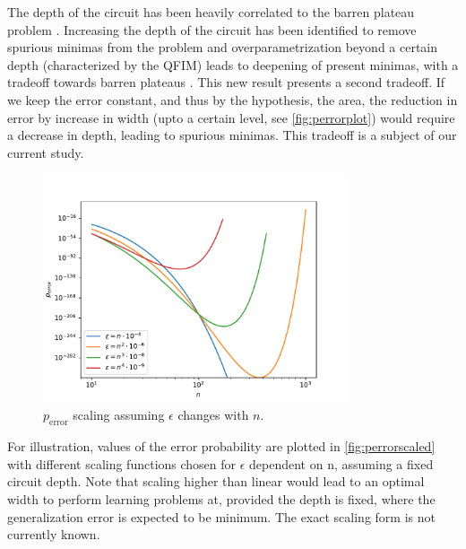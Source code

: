 The depth of the circuit has been heavily correlated to the barren plateau
problem \cite{larocca2021theory}. Increasing the depth of the circuit has been
identified to remove spurious minimas from the problem and overparametrization
beyond a certain depth (characterized by the QFIM) leads to deepening of present
minimas, with a tradeoff towards barren plateaus \cite{larocca2021diagnosing}.
This new result presents a second tradeoff. If we keep the error constant, and
thus by the hypothesis, the area, the reduction in error by increase in width
(upto a certain level, see \autoref{fig:perrorplot}) would require a decrease in
depth, leading to spurious minimas. This tradeoff is a subject of our current
study.

\begin{figure}[ht]
    \centering
    \includegraphics[width=0.8\textwidth]{figures/perrorscaled.pdf}
    \caption{\(p_{\text{error}}\) scaling assuming \(\epsilon\) changes with \(n\).}
    \label{fig:perrorscaled}
\end{figure}

For illustration, values of the error probability are plotted in
\autoref{fig:perrorscaled} with different scaling functions chosen for
\(\epsilon\) dependent on n, assuming a fixed circuit depth. Note that scaling
higher than linear would lead to an optimal width to perform learning problems
at, provided the depth is fixed, where the generalization error is expected to
be minimum. The exact scaling form is not currently known.
